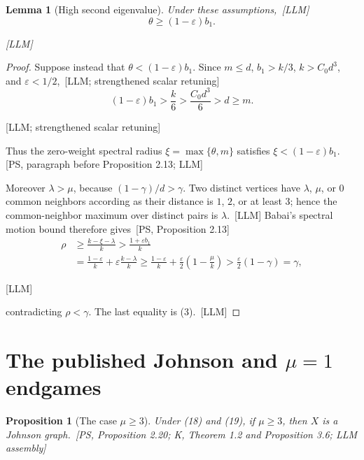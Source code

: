 \documentclass[10pt]{amsart}
\newtheorem{lemma}[theorem]{Lemma}
\newtheorem{proposition}[theorem]{Proposition}
\theoremstyle{remark}
\newcommand{\eps}{\varepsilon}
\newcommand{\prov}[1]{\unskip\, {\normalfont\scriptsize\color{provgray}\textsf{[#1]}}}
\newcommand{\eqprov}[1]{%
  \par\nobreak\vspace{-0.68\baselineskip}%
  \noindent\hfill{\normalfont\scriptsize\color{provgray}\textsf{[#1]}}%
  \par\vspace{0.20\baselineskip}%
}
\begin{document}
\begin{lemma}[High second eigenvalue]\label{lem:high-theta}
Under these assumptions,\prov{LLM}
\begin{equation}
\theta\ge(1-\eps)b_1.
\end{equation}
\eqprov{LLM}
\end{lemma}

\begin{proof}
Suppose instead that $\theta<(1-\eps)b_1$. Since $m\le d$, $b_1>k/3$, $k>C_0d^3$, and $\eps<1/2$,\prov{LLM; strengthened scalar retuning}
\[
(1-\eps)b_1>\frac{k}{6}>\frac{C_0d^3}{6}>d\ge m.
\]
\eqprov{LLM; strengthened scalar retuning}
Thus the zero-weight spectral radius $\xi=\max\{\theta,m\}$ satisfies $\xi<(1-\eps)b_1$.\prov{PS, paragraph before Proposition 2.13; LLM}

Moreover $\lambda>\mu$, because $(1-\gamma)/d>\gamma$. Two distinct vertices have $\lambda$, $\mu$, or $0$ common neighbors according as their distance is $1$, $2$, or at least $3$; hence the common-neighbor maximum over distinct pairs is $\lambda$.\prov{LLM} Babai's spectral motion bound therefore gives\prov{PS, Proposition 2.13}
\[
\begin{aligned}
\rho&\ge\frac{k-\xi-\lambda}{k}
>\frac{1+\eps b_1}{k}\\
&=\frac{1-\eps}{k}+\eps\frac{k-\lambda}{k}
\ge\frac{1-\eps}{k}+\frac{\eps}{2}\left(1-\frac{\mu}{k}\right)
>\frac{\eps}{2}(1-\gamma)=\gamma,
\end{aligned}
\]
\eqprov{LLM}
contradicting $\rho<\gamma$. The last equality is (3).\prov{LLM}
\end{proof}

\section{The published Johnson and \texorpdfstring{$\mu=1$}{mu=1} endgames}
\begin{proposition}[The case $\mu\ge3$]\label{prop:johnson}
Under (18) and (19), if $\mu\ge3$, then $X$ is a Johnson graph.\prov{PS, Proposition 2.20; K, Theorem 1.2 and Proposition 3.6; LLM assembly}
\end{proposition}
\end{document}
